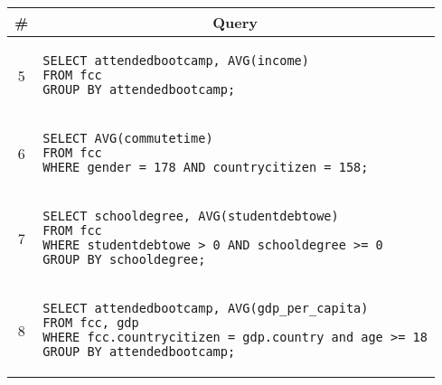 \begin{tabular}{cl}
\toprule
\# & \multicolumn{1}{c}{Query} \\
\midrule
5 & 
\begin{minipage}{6in}
\begin{lstlisting}[breaklines]
SELECT attendedbootcamp, AVG(income)
FROM fcc
GROUP BY attendedbootcamp;
\end{lstlisting}
\end{minipage}{queryno} \label[query]{q5} \\
6 & 
\begin{minipage}{6in}
\begin{lstlisting}[breaklines]
SELECT AVG(commutetime)
FROM fcc
WHERE gender = 178 AND countrycitizen = 158;
\end{lstlisting}
\end{minipage}{queryno} \label[query]{q6} \\
7 & 
\begin{minipage}{6in}
\begin{lstlisting}[breaklines]
SELECT schooldegree, AVG(studentdebtowe)
FROM fcc
WHERE studentdebtowe > 0 AND schooldegree >= 0
GROUP BY schooldegree;
\end{lstlisting}
\end{minipage}{queryno} \label[query]{q7}\\
8 & 
\begin{minipage}{6in}
\begin{lstlisting}[breaklines]
SELECT attendedbootcamp, AVG(gdp_per_capita)
FROM fcc, gdp
WHERE fcc.countrycitizen = gdp.country and age >= 18
GROUP BY attendedbootcamp;
\end{lstlisting}
\end{minipage}{queryno} \label[query]{q8}\\
\bottomrule
\end{tabular}

